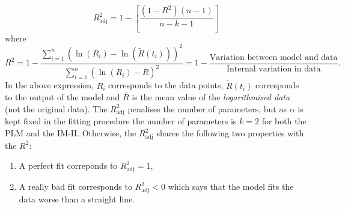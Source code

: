    $$R^2_{\mathrm{adj}}=1-\left[\dfrac{\left(1-R^2\right)\left(n-1\right)}{n-k-1}\right]$$
    where\vspace{-0.3cm}
    $$R^2=1-\dfrac{\sum\limits_{i=1}^{n}\left(\ln\left(R_i\right)-\ln\left(\tilde{R}(t_i)\right)\right)^2}{\sum\limits_{i=1}^{n}\left(\ln\left(R_i\right)-\overline{R}\right)^2}=1-\dfrac{\textrm{Variation between model and data}}{\textrm{Internal variation in data}}.$$
In the above expression, $R_i$ corresponds to the data points, $\tilde{R}(t_i)$ corresponds to the output of the model and $\overline{R}$ is the mean value of the \textit{logarithmised data} (not the original data). The $R^2_{\mathrm{adj}}$ penalises the number of parameters, but as $\alpha$ is kept fixed in the fitting procedure the number of parameters is $k=2$ for both the PLM and the IM-II. Otherwise, the $R^2_{\mathrm{adj}}$ shares the following two properties with the $R^2$:


    \begin{enumerate}
    \item A perfect fit correponds to $R^2_{\mathrm{adj}}=1$,
      \item A really bad fit corresponds to $R^2_{\mathrm{adj}}<0$ which says that the model fits the data worse than a straight line.      
      \end{enumerate}
    
  

  